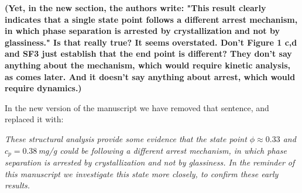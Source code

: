 \documentclass[11pt,a4paper]{article}
\newenvironment{referee}%
{\bigskip\singlespacing\bf}%
{\par\bigskip}
\begin{document}
\begin{referee}
(Yet, in the new section, the authors write: "This result clearly indicates that a single state point follows a different arrest mechanism, in which phase separation is arrested by crystallization and not by glassiness." Is that really true? It seems overstated. Don't Figure 1 c,d and SF3 just establish that the end point is different? They don't say anything about the mechanism, which would require kinetic analysis, as comes later. And it doesn't say anything about arrest, which would require dynamics.)
\end{referee}

In the new version of the manuscript we have removed that sentence, and replaced it with:

\emph{
These structural analysis provide some evidence that the state point $\phi\approx 0.33$ and $c_p=0.38\,$mg/g could be following a different arrest mechanism, in which phase separation is arrested by crystallization and not by glassiness. In the reminder of this manuscript we investigate this state more closely, to confirm these early results.}
\end{document}

